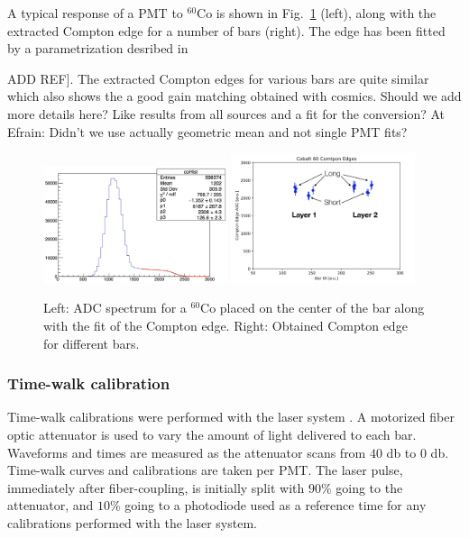 \documentclass[3p,final,twocolumn]{elsarticle}
\begin{document}
A typical response of a PMT to  $^{60}$Co is shown in Fig.~\ref{fig:mev_conversion} (left), along with the extracted Compton edge for a 
number of bars (right). The edge has been fitted by a parametrization desribed in {ADD REF]. The extracted Compton edges for various bars are quite similar which also shows the a good gain matching obtained with cosmics. 
{\color{red} Should we add more details here? Like results from all sources and a fit for the conversion? At Efrain: Didn't we use actually geometric mean and not single PMT fits?}

\begin{figure}[h!]
	\centering
		\includegraphics[width=0.48\textwidth]{co-compton.png}
		\includegraphics[width=0.48\textwidth]{coedges.png}
	\caption{Left: ADC spectrum for a $^{60}$Co placed on the center of the bar along with the fit of the Compton edge. Right: Obtained Compton edge for different bars.}
	\label{fig:mev_conversion}
\end{figure}

\subsubsection{Time-walk calibration}
Time-walk calibrations were performed with the laser system \cite{band-laser}. A motorized fiber optic attenuator is used to vary
the amount of light delivered to each bar. Waveforms and times are measured as the attenuator scans from $40$ \si{\decibel} to $0$ 
\si{\decibel}. Time-walk curves and calibrations are taken per PMT. The laser pulse, immediately after fiber-coupling, is initially 
split with $90\%$ going to the attenuator, and $10\%$ going to a photodiode used as a reference time for any calibrations 
performed with the laser system.

}
\end{document}
